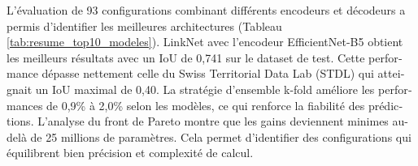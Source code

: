 \begin{otherlanguage}{french}
L'évaluation de 93 configurations combinant différents encodeurs et décodeurs a permis d'identifier les meilleures architectures (Tableau \ref{tab:resume_top10_modeles}). LinkNet avec l'encodeur EfficientNet-B5 obtient les meilleurs résultats avec un IoU de 0,741 sur le dataset de test. Cette performance dépasse nettement celle du Swiss Territorial Data Lab (STDL) qui atteignait un IoU maximal de 0,40. La stratégie d'ensemble k-fold améliore les performances de 0,9\% à 2,0\% selon les modèles, ce qui renforce la fiabilité des prédictions. L'analyse du front de Pareto montre que les gains deviennent minimes au-delà de 25 millions de paramètres. Cela permet d'identifier des configurations qui équilibrent bien précision et complexité de calcul.

\begin{table}[htbp]
    \centering
    \caption{Top 10 des modèles par IoU moyen sur dataset de test}
    \label{tab:resume_top10_modeles}
\end{table}


\end{otherlanguage}
